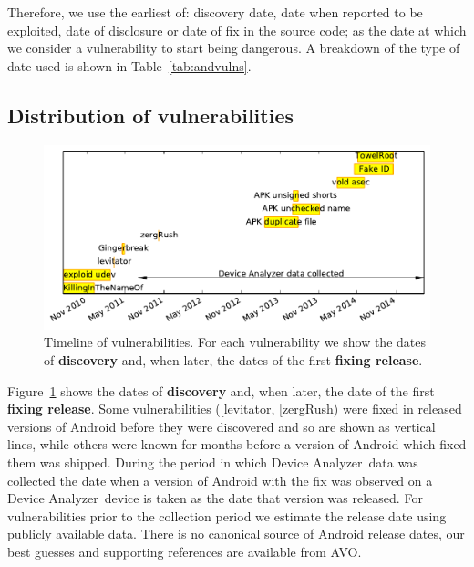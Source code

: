 \documentclass{llncs}
\makeatletter
\newcommand{\da}{Device Analyzer}
\newcommand{\avo}{AVO}
\def\avovuln{\@ifnextchar[{\@avovulnsspecific}{\@avovulngeneral}}
\def\@avovulnsspecific[#1]#2{\emph{\href{http://androidvulnerabilities.org/vulnerabilities/#1}{#2}}}
\def\@avovulngeneral#1{\emph{\href{http://androidvulnerabilities.org/vulnerabilities/#1}{#1}}}
\makeatother
\begin{document}
Therefore, we use the earliest of: discovery date, date when reported to be exploited, date of disclosure or date of fix in the source code; as the date at which we consider a vulnerability to start being dangerous.
A breakdown of the type of date used is shown in Table~\ref{tab:andvulns}.


\subsection{Distribution of vulnerabilities}
\begin{figure}
 \centering
 \includegraphics[width=\columnwidth]{figures/vulnerabilities_timeline}
 \caption{Timeline of vulnerabilities. For each vulnerability we show the dates of \textbf{discovery} and, when later, the dates of the first \textbf{fixing release}.}
 \label{fig:vulnerabilities_timeline}
\end{figure}

Figure~\ref{fig:vulnerabilities_timeline} shows the dates of \textbf{discovery} and, when later, the date of the first \textbf{fixing release}.
Some vulnerabilities (\avovuln{levitator}, \avovuln{zergRush}) were fixed in released versions of Android before they were discovered and so are shown as vertical lines, while others were known for months before a version of Android which fixed them was shipped.
During the period in which \da\ data was collected the date when a version of Android with the fix was observed on a \da\ device is taken as the date that version was released.
For vulnerabilities prior to the collection period we estimate the release date using publicly available data.
There is no canonical source of Android release dates, our best guesses and supporting references are available from \avo.

\end{document}
